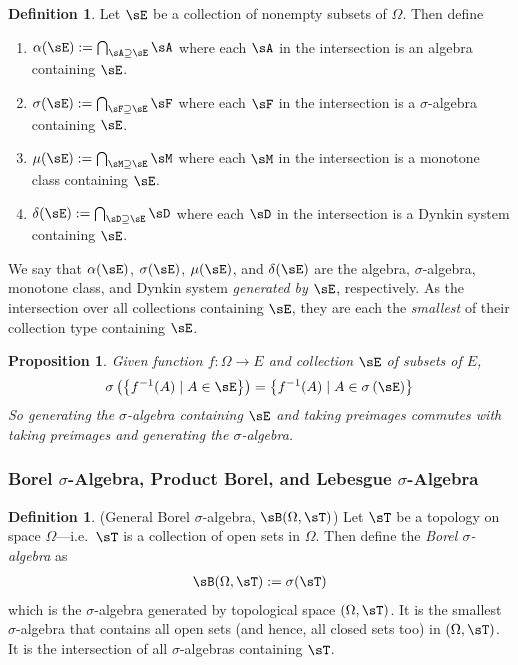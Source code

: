 \documentclass[12pt]{article}
\theoremstyle{plain}
\newtheorem{prop}[thm]{Proposition}
\theoremstyle{definition}
\newtheorem{defn}[thm]{Definition}
\theoremstyle{remark}
\newcommand{\ra}{\rightarrow}
\begin{document}
\begin{defn}
Let $\sE$ be a collection of nonempty subsets of $\Omega$. Then
define
\begin{enumerate}
  \item $\alpha(\sE) := \bigcap_{\sA \supseteq \sE} \sA$ where each
    $\sA$ in the intersection is an algebra containing $\sE$.
  \item $\sigma(\sE) := \bigcap_{\sF \supseteq \sE} \sF$
    where each $\sF$ in the intersection is a $\sigma$-algebra
    containing $\sE$.
  \item $\mu(\sE) := \bigcap_{\sM \supseteq \sE} \sM$
    where each $\sM$ in the intersection is a monotone class containing
    $\sE$.
  \item $\delta(\sE) := \bigcap_{\sD \supseteq \sE} \sD$
    where each $\sD$ in the intersection is a Dynkin system containing
    $\sE$.
\end{enumerate}
We say that $\alpha(\sE)$, $\sigma(\sE)$, $\mu(\sE)$, and $\delta(\sE)$ are the
algebra, $\sigma$-algebra, monotone class, and Dynkin system
\emph{generated by $\sE$}, respectively. As the intersection over all
collections containing $\sE$, they are each the \emph{smallest}
of their collection type containing $\sE$.
\end{defn}

\begin{prop}
\label{prop:gensigal}
Given function $f:\Omega\ra E$ and collection $\sE$ of subsets of $E$,
\begin{align*}
  \sigma\left( \left\{ f^{-1}(A) \;|\; A\in\sE \right\} \right)
  =
  \left\{ f^{-1}(A) \;|\; A\in\sigma\left( \sE \right)\right\}
\end{align*}
So generating the $\sigma$-algebra containing $\sE$ and taking
preimages \emph{commutes} with taking preimages and generating the
$\sigma$-algebra.
\end{prop}


\subsubsection{Borel $\sigma$-Algebra, Product Borel, and Lebesgue
$\sigma$-Algebra}

\begin{defn}(General Borel $\sigma$-algebra, $\sB(\Omega,\sT)$)
\label{defn:borel-general}
Let $\sT$ be a topology on space $\Omega$---i.e.\ $\sT$ is a collection
of open sets in $\Omega$. Then define the \emph{Borel $\sigma$-algebra}
as
\begin{align*}
  \sB(\Omega,\sT):=\sigma(\sT)
\end{align*}
which is the $\sigma$-algebra generated by topological space
$(\Omega,\sT)$. It is the smallest $\sigma$-algebra that contains all
open sets (and hence, all closed sets too) in $(\Omega,\sT)$. It is the
intersection of all $\sigma$-algebras containing $\sT$.
\end{defn}
\end{document}
